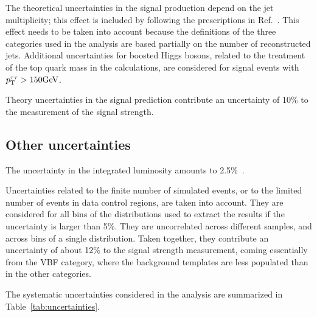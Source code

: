 The theoretical uncertainties in the signal production depend on the jet multiplicity; this effect is included by following the prescriptions in Ref.~\cite{Stewart:2011cf}. This effect needs to be taken into account because the definitions of the three categories used in the analysis are based partially on the number of reconstructed jets. Additional uncertainties for boosted Higgs bosons, related to the treatment of the top quark mass in the calculations, are considered for signal events with $p_\mathrm{T}^{\tau\tau}>150\mathrm{GeV}$.

Theory uncertainties in the signal prediction contribute an uncertainty of 10\% to the measurement of the signal strength.





\subsection{Other uncertainties}

The uncertainty in the integrated luminosity amounts to 2.5\%~\cite{CMS-PAS-LUM-17-001}.

Uncertainties related to the finite number of simulated events, or to the limited number of events in data control regions, are taken into account. They are considered for all bins of the distributions used to extract the results if the uncertainty is larger than 5\%. They are uncorrelated across different samples, and across bins of a single distribution. Taken together, they contribute an uncertainty of about 12\% to the signal strength measurement, coming essentially from the VBF category, where the background templates are less
populated than in the other categories.

The systematic uncertainties considered in the analysis are summarized in Table~\ref{tab:uncertainties}.

